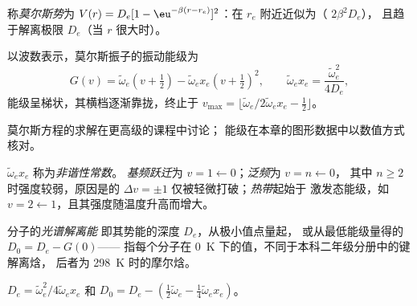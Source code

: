 \begin{definition}[莫尔斯势]\label{def:b3:rovibrational-spectroscopy:morse}
称\emph{莫尔斯势}为 $V(r) = D_e[1 -
\eu^{-\beta(r - r_e)}]^2$：在 $r_e$ 附近近似为（ $2\beta^2D_e$），
且趋于解离极限 $D_e$（当 $r$ 很大时）。
\end{definition}

\begin{proposition}[莫尔斯振子的能级]\label{prop:b3:rovibrational-spectroscopy:morse-levels}
以波数表示，莫尔斯振子的振动能级为
\[
G(v) = \tilde\omega_e(v + \tfrac12) - \tilde\omega_ex_e(v + \tfrac12)^2, \qquad
\tilde\omega_ex_e = \frac{\tilde\omega_e^2}{4D_e},
\]
能级呈梯状，其横档逐渐靠拢，终止于 $v_{\max} = \lfloor\tilde\omega_e/
2\tilde\omega_ex_e - \frac12\rfloor$。
\end{proposition}
\admitted

莫尔斯方程的求解在更高级的课程中讨论；
能级在本章的图形数据中以数值方式核对。

\begin{definition}\label{def:b3:rovibrational-spectroscopy:anharmonic}
$\tilde\omega_ex_e$ 称为\emph{非谐性常数}。
\emph{基频跃迁}为
$v = 1 \leftarrow 0$；\emph{泛频}为 $v = n \leftarrow 0$，
其中 $n \ge 2$ 时强度较弱，原因是的 $\Delta v = \pm1$
仅被轻微打破；\emph{热带}起始于
激发态能级，如 $v = 2 \leftarrow 1$，且其强度随温度升高而增大。
\end{definition}

\begin{definition}[光谱解离能]\label{def:b3:rovibrational-spectroscopy:dissociation}
分子的\emph{光谱解离能}
即其势能的深度 $D_e$，从极小值点量起，
或从最低能级量得的 $D_0 = D_e - G(0)$——
指每个分子在 \qty{0}{K} 下的值，不同于本科二年级分册中的键解离焓，
后者为 \qty{298}{K} 时的摩尔焓。
\end{definition}

\begin{corollary}[莫尔斯振子的 $D_e$ 与 $D_0$]\label{cor:b3:rovibrational-spectroscopy:de}
$D_e = \tilde\omega_e^2/4\tilde\omega_ex_e$ 和 $D_0 = D_e - (\frac12\tilde\omega_e -
\frac14\tilde\omega_ex_e)$。
\end{corollary}

